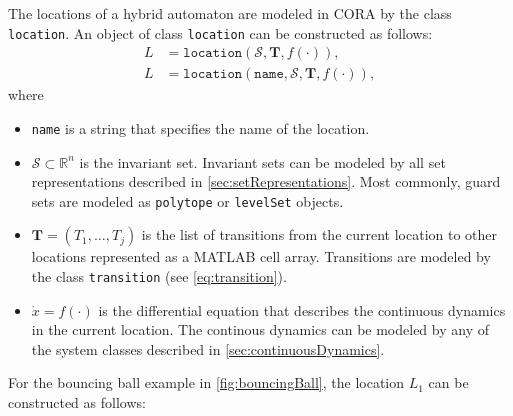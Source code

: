 \vspace{1cm}

The locations of a hybrid automaton are modeled in CORA by the class \texttt{location}. An object of class \texttt{location} can be constructed as follows:
\begin{equation}
    \begin{split}
        L &= \texttt{location}(\mathcal{S},\mathbf{T},f(\cdot)), \\
        L &= \texttt{location}(\texttt{name},\mathcal{S},\mathbf{T},f(\cdot)),
    \end{split}
    \label{eq:location}
\end{equation}
where
\begin{itemize}
    \item \texttt{name} is a string that specifies the name of the location.
    \item $\mathcal{S} \subset \mathbb{R}^n$ is the invariant set. Invariant sets can be modeled by all set representations described in \cref{sec:setRepresentations}. Most commonly, guard sets are modeled as \texttt{polytope} or \texttt{levelSet} objects.
    \item $\mathbf{T} = (T_1,\dots,T_j)$ is the list of transitions from the current location to other locations represented as a MATLAB cell array. Transitions are modeled by the class \texttt{transition} (see \eqref{eq:transition}).
    \item $\dot x = f(\cdot)$ is the differential equation that describes the continuous dynamics in the current location. The continous dynamics can be modeled by any of the system classes described in \cref{sec:continuousDynamics}.
\end{itemize}

For the bouncing ball example in \cref{fig:bouncingBall}, the location $L_1$ can be constructed as follows:

\begin{center}
    \begin{minipage}[t]{0.1\textwidth}
        \vspace{10pt}
    \end{minipage}
    \begin{minipage}[t]{0.8\textwidth}
        \footnotesize
        
    \end{minipage}
\end{center}

\vspace{1cm}



